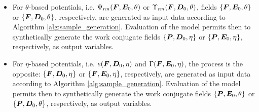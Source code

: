 \vspace{2mm}

\vspace{-2mm}
\begin{itemize}
	\item For $\theta$-based potentials, i.e. $\Psi_{nn}(\boldsymbol{F},\boldsymbol{E}_0,\theta)$ or $\Upsilon_{nn}(\boldsymbol{F},\boldsymbol{D}_0,\theta)$, fields $\{\boldsymbol{F},\boldsymbol{E}_0,\theta\}$ or $\{\boldsymbol{F},\boldsymbol{D}_0,\theta\}$, respectively, are generated as input data according to Algorithm \ref{alg:sample_generation}. Evaluation of the model permits then to synthetically generate the work conjugate fields $\{\boldsymbol{P},\boldsymbol{D}_0,\eta\}$ or $\{\boldsymbol{P},\boldsymbol{E}_0,\eta\}$, respectively, as output variables. 
	
	\item For $\eta$-based potentials, i.e. $e(\boldsymbol{F},\boldsymbol{D}_0,\eta)$ and $\Gamma(\boldsymbol{F},\boldsymbol{E}_0,\eta)$, the process is the opposite:  $\{\boldsymbol{F},\boldsymbol{D}_0,\eta\}$ or $\{\boldsymbol{F},\boldsymbol{E}_0,\eta\}$, respectively, are generated as input data according to Algorithm \ref{alg:sample_generation}. Evaluation of the model permits then to synthetically generate the work conjugate fields $\{\boldsymbol{P},\boldsymbol{E}_0,\theta\}$ or $\{\boldsymbol{P},\boldsymbol{D}_0,\theta\}$, respectively, as output variables.	
\end{itemize} 


\vspace{2mm}

\vspace{-2mm}

